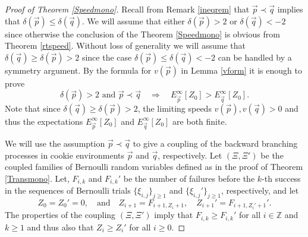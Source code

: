 \documentclass[reqno,letterpaper,11pt]{amsart}
\theoremstyle{remark}
\theoremstyle{definition}
\begin{document}
\begin{proof}[Proof of Theorem \ref{Speedmono}]
Recall from Remark \ref{ineqrem} that ${\vec{p}} \prec {\vec{q}}$ implies that ${\delta}({\vec{p}}) \leq {\delta}({\vec{q}})$.  We will assume that either ${\delta}({\vec{p}})>2$ or ${\delta}({\vec{q}}) < -2$ since otherwise the conclusion of the Theorem \ref{Speedmono} is obvious from Theorem \ref{rtspeed}. Without loss of generality we will assume that ${\delta}({\vec{q}}) \geq {\delta}({\vec{p}}) > 2$ since the case $ {\delta}({\vec{p}}) \leq {\delta}({\vec{q}}) < -2$ can be handled by a symmetry argument. 
By the formula for $v({\vec{p}})$ in Lemma \ref{vform} it is enough to prove
\begin{equation}\label{EZineq}
 {\delta}({\vec{p}}) > 2 \text{ and } {\vec{p}} \prec {\vec{q}} \quad \Longrightarrow \quad E_{\vec{p}}^\infty[Z_0] > E_{\vec{q}}^\infty[Z_0]. 
\end{equation}
Note that since ${\delta}({\vec{q}})\geq {\delta}({\vec{p}}) > 2$, the limiting speeds $v({\vec{p}}),v({\vec{q}}) > 0$ and thus the expectations $E_{\vec{p}}^\infty[Z_0]$ and $E_{\vec{q}}^\infty[Z_0]$ are both finite.

We will use the assumption ${\vec{p}} \prec {\vec{q}}$ to give a coupling of the backward branching processes in cookie environments ${\vec{p}}$ and ${\vec{q}}$, respectively. 
Let $(\Xi, \Xi')$ be the coupled families of Bernoulli random variables defined as in the proof of Theorem \ref{Transmono}. 
 Let, $F_{i,k}$ and $F_{i,k}'$ be the number of failures before the $k$-th success in the sequences of Bernoulli trials $\{\xi_{i,j}\}_{j\geq 1}$ and $\{\xi_{i,j}'\}_{j\geq 1}$, respectively, and let
\[
 Z_0 = Z_0' = 0, \quad\text{and}\quad Z_{i+1} = F_{i+1,Z_i + 1}, \quad  Z_{i+1}' = F_{i+1,Z_i' + 1}'.
\]
The properties of the coupling $(\Xi,\Xi')$ imply that
$F_{i,k} \geq F_{i,k}'$ for all $i\in {\mathbb Z}$ and $k\geq 1$ and thus also that $Z_i \geq Z_i'$ for all $i\geq 0$. 


\end{proof}
\end{document}
